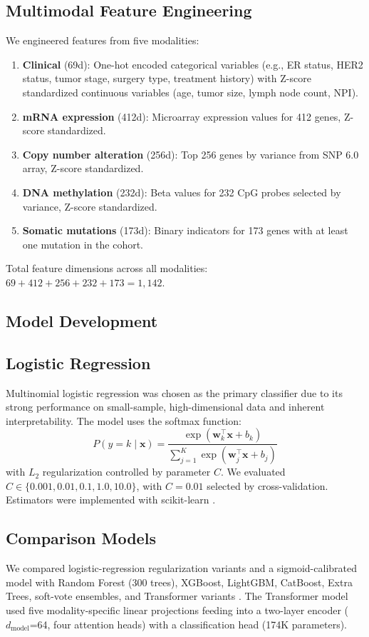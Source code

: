 \documentclass[10pt,journal,compsoc,twocolumn]{IEEEtran}
\begin{document}
\subsection{Multimodal Feature Engineering}
We engineered features from five modalities:
\begin{enumerate}
  \item \textbf{Clinical} (69d): One-hot encoded categorical variables (e.g., ER status, HER2 status, tumor stage, surgery type, treatment history) with Z-score standardized continuous variables (age, tumor size, lymph node count, NPI).
  \item \textbf{mRNA expression} (412d): Microarray expression values for 412 genes, Z-score standardized.
  \item \textbf{Copy number alteration} (256d): Top 256 genes by variance from SNP 6.0 array, Z-score standardized.
  \item \textbf{DNA methylation} (232d): Beta values for 232 CpG probes selected by variance, Z-score standardized.
  \item \textbf{Somatic mutations} (173d): Binary indicators for 173 genes with at least one mutation in the cohort.
\end{enumerate}

Total feature dimensions across all modalities: $69 + 412 + 256 + 232 + 173 = 1{,}142$.

\subsection{Model Development}

\subsection{Logistic Regression}
Multinomial logistic regression was chosen as the primary classifier due to its strong performance on small-sample, high-dimensional data and inherent interpretability. The model uses the softmax function:
\begin{equation}
  P(y = k \mid \mathbf{x}) = \frac{\exp(\mathbf{w}_k^\top \mathbf{x} + b_k)}{\sum_{j=1}^{K} \exp(\mathbf{w}_j^\top \mathbf{x} + b_j)}
  \label{eq:softmax}
\end{equation}
with $L_2$ regularization controlled by parameter $C$. We evaluated $C \in \{0.001, 0.01, 0.1, 1.0, 10.0\}$, with $C = 0.01$ selected by cross-validation. Estimators were implemented with scikit-learn \cite{pedregosa2011scikit}.

\subsection{Comparison Models}
We compared logistic-regression regularization variants and a sigmoid-calibrated model with Random Forest (300 trees), XGBoost, LightGBM, CatBoost, Extra Trees, soft-vote ensembles, and Transformer variants \cite{vaswani2017attention}. The Transformer model used five modality-specific linear projections feeding into a two-layer encoder ($d_{\text{model}}$=64, four attention heads) with a classification head (174K parameters).
\end{document}
